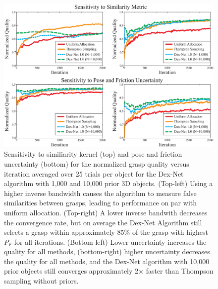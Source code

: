 \begin{figure}[t!]
\centering
\includegraphics[scale=0.21]{figures/illustrations/combined_weight_and_u_sensitivity.eps}
\caption{Sensitivity to similiarity kernel (top) and pose and friction uncertainty (bottom) for the normalized grasp quality versus iteration averaged over 25 trials per object for the Dex-Net algorithm with 1,000 and 10,000 prior 3D objects.
(Top-left) Using a higher inverse bandwidth causes the algorithm to measure false similarities between grasps, leading to performance on par with uniform allocation.
(Top-right) A lower inverse bandwith decreases the convergence rate, but on average the Dex-Net Algorithm still selects a grasp within approximately 85\% of the grasp with highest $P_F$ for all iterations.
(Bottom-left) Lower uncertainty increases the quality for all methods, (bottom-right) higher uncertainty decreases the quality for all methods, and the Dex-Net algorithm with 10,000 prior objects still converges approximately 2$\times$ faster than Thompson sampling without priors. 
}
\vspace*{-15pt}
\end{figure}